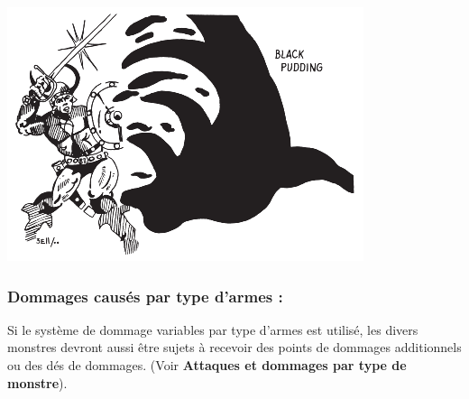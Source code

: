 \documentclass[11pt]{article}
\begin{document}
{\begin{center}
\includegraphics[width=0.8\linewidth]{./images/black-pudding.png}
\end{center}

\subsubsection*{Dommages causés par type d'armes :}

Si le système de dommage variables par type d'armes est utilisé, les divers monstres devront aussi être sujets à recevoir des points de dommages additionnels ou des dés de dommages. (Voir \textbf{Attaques et dommages par type de monstre}).

\bigskip

}
\end{document}
